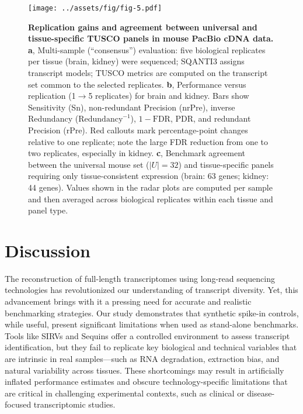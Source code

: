 \documentclass[pdflatex,sn-nature]{sn-jnl}%
\begin{document}
\begin{figure}[p]
    \centering
    \texttt{[image: ../assets/fig/fig-5.pdf]}
    \caption{\textbf{Replication gains and agreement between universal and tissue-specific TUSCO panels in mouse PacBio cDNA data.} \textbf{a}, Multi-sample (``consensus'') evaluation: five biological replicates per tissue (brain, kidney) were sequenced; SQANTI3 assigns transcript models; TUSCO metrics are computed on the transcript set common to the selected replicates. \textbf{b}, Performance versus replication (1$\rightarrow$5 replicates) for brain and kidney. Bars show Sensitivity (Sn), non-redundant Precision (nrPre), inverse Redundancy ($\mathrm{Redundancy}^{-1}$), $1 - \mathrm{FDR}$, PDR, and redundant Precision (rPre). Red callouts mark percentage-point changes relative to one replicate; note the large FDR reduction from one to two replicates, especially in kidney. \textbf{c}, Benchmark agreement between the universal mouse set ($|U| = 32$) and tissue-specific panels requiring only tissue-consistent expression (brain: 63 genes; kidney: 44 genes). Values shown in the radar plots are computed per sample and then averaged across biological replicates within each tissue and panel type.}
    \label{fig:figure5}
\end{figure}


\section{Discussion}

The reconstruction of full-length transcriptomes using long-read sequencing technologies has revolutionized our understanding of transcript diversity. Yet, this advancement brings with it a pressing need for accurate and realistic benchmarking strategies. Our study demonstrates that synthetic spike-in controls, while useful, present significant limitations when used as stand-alone benchmarks. Tools like SIRVs and Sequins offer a controlled environment to assess transcript identification, but they fail to replicate key biological and technical variables that are intrinsic in real samples---such as RNA degradation, extraction bias, and natural variability across tissues. These shortcomings may result in artificially inflated performance estimates and obscure technology-specific limitations that are critical in challenging experimental contexts, such as clinical or disease-focused transcriptomic studies.
\end{document}
